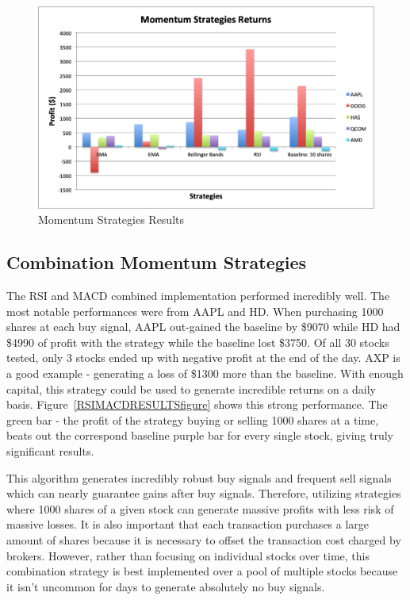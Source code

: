 \documentclass[letterpaper,11pt]{article}
\begin{document}
\begin{figure}[h]
\centering
\includegraphics[width=.9\textwidth]{momentumstrategiesreturns.png}
\caption{Momentum Strategies Results  \label{overflow}}
\label{MOMENTUMfigure}
\end{figure}

\subsection{Combination Momentum Strategies}

The RSI and MACD combined implementation performed incredibly well. The most notable performances were from AAPL and HD. When purchasing 1000 shares at each buy signal, AAPL out-gained the baseline by \$9070  while HD had \$4990 of profit with the strategy while the baseline lost \$3750. Of all 30 stocks tested, only 3 stocks ended up with negative profit at the end of the day. AXP is a good example - generating a loss of \$1300 more than the baseline. With enough capital, this strategy could be used to generate incredible returns on a daily basis. Figure~\ref{RSIMACDRESULTSfigure} shows this strong performance. The green bar - the profit of the strategy buying or selling 1000 shares at a time, beats out the correspond baseline purple bar for every single stock, giving truly significant results. 

This algorithm generates incredibly robust buy signals and frequent sell signals which can nearly guarantee gains after buy signals. Therefore, utilizing strategies where 1000 shares of a given stock can generate massive profits with less risk of massive losses. It is also important that each transaction purchases a large amount of shares because it is necessary to offset the transaction cost charged by brokers. However, rather than focusing on individual stocks over time, this combination strategy is best implemented over a pool of multiple stocks because it isn't uncommon for days to generate absolutely no buy signals.
\end{document}
